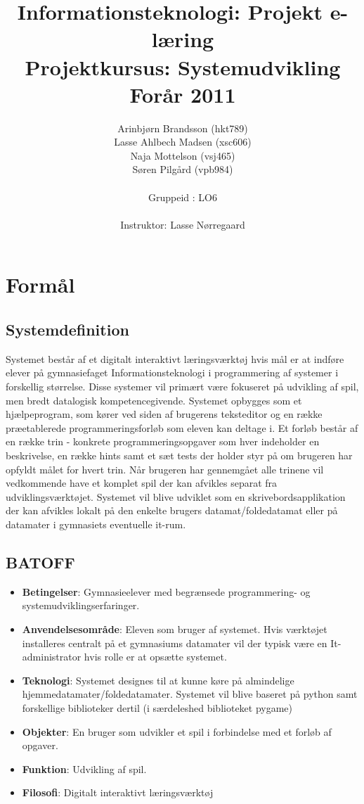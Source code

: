 \documentclass[10pt,a4paper,danish]{article}
\title{Informationsteknologi: Projekt e-læring \\ Projektkursus: Systemudvikling \\Forår 2011}
\author{Arinbjørn Brandsson (hkt789)\\Lasse Ahlbech Madsen (xsc606)\\Naja Mottelson (vsj465)\\Søren Pilgård (vpb984)\\
\\
Gruppeid : LO6\\
\\Instruktor: Lasse Nørregaard}
\begin{document}
\maketitle
\newpage

\tableofcontents
\newpage

\section{Formål}
\subsection{Systemdefinition}
Systemet består af et digitalt interaktivt læringsværktøj hvis mål er at indføre elever på gymnasiefaget Informationsteknologi i programmering af systemer i forskellig størrelse. Disse systemer vil primært være fokuseret på udvikling af spil, men bredt datalogisk kompetencegivende. Systemet opbygges som et hjælpeprogram, som kører ved siden af brugerens teksteditor og en række præetablerede programmeringsforløb som eleven kan deltage i. Et forløb består af en række trin - konkrete programmeringsopgaver som hver indeholder en beskrivelse, en række hints samt et sæt tests der holder styr på om brugeren har opfyldt målet for hvert trin. Når brugeren har gennemgået alle trinene vil vedkommende have et komplet spil der kan afvikles separat fra udviklingsværktøjet. Systemet vil blive udviklet som en skrivebordsapplikation der kan afvikles lokalt på den enkelte brugers datamat/foldedatamat eller på datamater i gymnasiets eventuelle it-rum.

\subsection{BATOFF}
\begin{itemize}
\item \textbf{Betingelser}: Gymnasieelever med begrænsede programmering- og systemudviklingserfaringer. 
\item \textbf{Anvendelsesområde}: Eleven som bruger af systemet. Hvis værktøjet installeres centralt på et
gymnasiums datamater vil der typisk være en It-administrator hvis rolle er at opsætte systemet.
\item \textbf{Teknologi}: Systemet designes til at kunne køre på almindelige hjemmedatamater/foldedatamater.
Systemet vil blive baseret på python samt forskellige biblioteker dertil (i særdeleshed biblioteket pygame)
\item \textbf{Objekter}: En bruger som udvikler et spil i forbindelse med et forløb af opgaver. 
\item \textbf{Funktion}: Udvikling af spil.
\item \textbf{Filosofi}:  Digitalt interaktivt læringsværktøj
\end{itemize}
\end{document}
